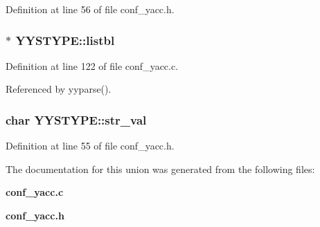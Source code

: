 Definition at line 56 of file conf\_\-yacc.h.
\subsubsection{$\ast$ {\bf YYSTYPE::listbl}}\label{unionYYSTYPE_o1}




Definition at line 122 of file conf\_\-yacc.c.

Referenced by yyparse().
\subsubsection{\setlength{\rightskip}{0pt plus 5cm}char {\bf YYSTYPE::str\_\-val}}\label{unionYYSTYPE_o0}




Definition at line 55 of file conf\_\-yacc.h.

The documentation for this union was generated from the following files:\begin{CompactItemize}
\item 
{\bf conf\_\-yacc.c}\item 
{\bf conf\_\-yacc.h}\end{CompactItemize}
